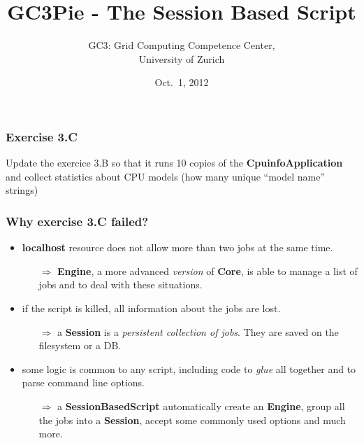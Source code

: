 \documentclass[english,serif,mathserif,xcolor=pdftex,dvipsnames,table]{beamer}
\title[The Session Based Script]{%
GC3Pie - The Session Based Script
}
\author[Antonio Messina]{%
  GC3: Grid Computing Competence Center, \\
  University of Zurich
}
\date{Oct.~1, 2012}
\begin{document}
\maketitle

\begin{frame}
  \frametitle{Exercise 3.C}

  Update the exercice 3.B so that it runs 10 copies of the
  \textbf{CpuinfoApplication} and collect statistics about CPU models
  (how many unique ``model name'' strings)
\end{frame}

\begin{frame}[fragile]
  \frametitle{Why exercise 3.C failed?}
  \begin{itemize}
  \item \textbf{localhost} resource does not allow more than two jobs
    at the same time.

    \pause
    \begin{itemize}
    \item[$\Rightarrow$] \textbf{Engine}, a more advanced
      \textit{version} of \textbf{Core}, is able to manage a list of
      jobs and to deal with these situations.
    \end{itemize}

    \pause
    \+
  \item if the script is killed, all information about the jobs are
    lost.
    \pause
    \begin{itemize}
    \item [$\Rightarrow$] a \textbf{Session} is a \textit{persistent
        collection of jobs}. They are saved on the filesystem or a DB.
    \end{itemize}

    \pause
    \+
  \item some logic is common to any script, including code to
    \textit{glue} all together and to parse command line options.  \pause
    \begin{itemize}
    \item [$\Rightarrow$] a \textbf{SessionBasedScript} automatically
      create an \textbf{Engine}, group all the jobs into a
      \textbf{Session}, accept some commonly used options and much more.
    \end{itemize}
  \end{itemize}
\end{frame}
\end{document}
